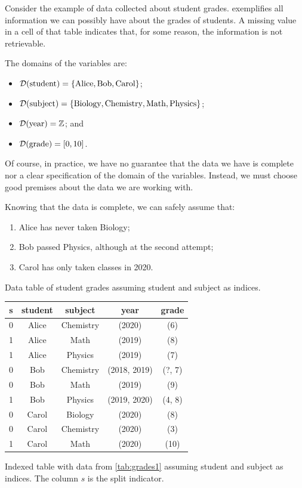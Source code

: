 Consider the example of data collected about student grades.  
exemplifies all information we can possibly have about the grades of students.  A missing
value in a cell of that table indicates that, for some reason, the information is not
retrievable.

The domains of the variables are:
\begin{itemize}
  \itemsep0em
  \item $\mathcal{D}\!\left(\text{student}\right) = \left\{\text{Alice}, \text{Bob}, \text{Carol}\right\}$;
  \item $\mathcal{D}\!\left(\text{subject}\right) = \left\{\text{Biology}, \text{Chemistry}, \text{Math},
    \text{Physics}\right\}$;
  \item $\mathcal{D}\!\left(\text{year}\right) = \mathbb{Z}$; and
  \item $\mathcal{D}\!\left(\text{grade}\right) = \left[0, 10\right]$.
\end{itemize}

Of course, in practice, we have no guarantee that the data we have is complete nor a
clear specification of the domain of the variables.  Instead, we must choose good
premises about the data we are working with.

Knowing that the data is complete, we can safely assume that:
\begin{enumerate}
  \itemsep0em
  \item Alice has never taken Biology;
  \item Bob passed Physics, although at the second attempt;
  \item Carol has only taken classes in 2020.
\end{enumerate}

\begin{tablebox}[label=tab:grades2]{Data table of student grades assuming student and subject as indices.}
  \centering
  \begin{tabular}{ccc|cc}
    \toprule
    \textbf{s} & \textbf{student} & \textbf{subject} & \textbf{year} & \textbf{grade} \\
    \midrule
    0 & Alice & Chemistry & (2020) & (6) \\
    1 & Alice & Math & (2019) & (8) \\
    1 & Alice & Physics & (2019) & (7) \\
    0 & Bob & Chemistry & (2018, 2019) & (?, 7) \\
    0 & Bob & Math & (2019) & (9) \\
    1 & Bob & Physics & (2019, 2020) & (4, 8) \\
    0 & Carol & Biology & (2020) & (8) \\
    0 & Carol & Chemistry & (2020) & (3) \\
    1 & Carol & Math & (2020) & (10) \\
    \bottomrule
  \end{tabular}
  \tcblower
  Indexed table with data from \cref{tab:grades1} assuming student and
  subject as indices.  The column $s$ is the split indicator.
\end{tablebox}

